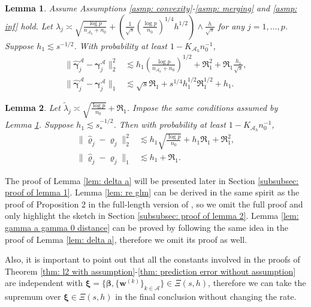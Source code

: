 \documentclass[12pt]{article}
\newcommand{\bxi}{\bm{\xi}}
\newcommand{\twonorm}[1]{\|#1\|_{2}}
\newcommand{\onenorm}[1]{\|#1\|_{1}}
\newcommand{\bbeta}{\bm{\beta}}
\newcommand{\brho}{\bm{\varrho}}
\newcommand{\hrho}{\hat{\bm{\varrho}}}
\newcommand{\tlambda}{\tilde{\lambda}}
\newcommand{\bgammaa}{\bm{\gamma}^{\ma}}
\newcommand{\hgammaa}{\hat{\bm{\gamma}}^{\ma}}
\newcommand{\bwk}[1]{\bm{w}^{(#1)}}
\newcommand{\ma}{\mathcal{A}}
\newcommand{\mah}{\mathcal{A}_h}
\newcommand{\nah}{n_{\mathcal{A}_h}}
\newcommand{\Kah}{K_{\mah}}
\newcommand{\<}{\langle}
\renewcommand{\>}{\rangle}
\newtheorem{lemma}{Lemma}
\begin{document}
\begin{lemma}\label{lem: inf lemma gamma a}
	Assume Assumptions \ref{asmp: convexity}-\ref{asmp: merging} and \ref{asmp: inf} hold. Let $\lambda_j \asymp \sqrt{\frac{\log p}{\nah+n
	_0}} + (\frac{1}{\sqrt{s}}(\frac{\log p}{n_0})^{1/4}h^{1/2})\wedge \frac{h}{\sqrt{s}}$ for any $j = 1, \ldots, p$. Suppose $h_1 \lesssim s^{-1/2}$. With probability at least $1-\Kah n_0^{-1}$,
	\begin{align}
		\twonorm{\hgammaa_j - \bgammaa_j}^2 &\lesssim h_1\left(\frac{\log p}{\nah+n_0}\right)^{1/2} + \Re_1^2 + \Re_1\frac{h_1}{\sqrt{s}},\\
		\onenorm{\hgammaa_j - \bgammaa_j} &\lesssim \sqrt{s}\Re_1 + s^{1/4}h_1^{1/2}\Re_1^{1/2} + h_1.
	\end{align}
\end{lemma}

\begin{lemma}\label{lem: inf lemma gamma delta}
	Let $\tlambda_j \asymp \sqrt{\frac{\log p}{n_0}} + \Re_1$. Impose the same conditions assumed by Lemma \ref{lem: inf lemma gamma a}. Suppose $h_1 \lesssim s_*^{-1/2}$. Then with probability at least $1-\Kah n_0^{-1}$,
	\begin{align}
		\twonorm{\hrho_j - \brho_j}^2 &\lesssim h_1\sqrt{\frac{\log p}{n_0}} + h_1\Re_1 + \Re_1^2,\\
		\onenorm{\hrho_j - \brho_j} &\lesssim h_1 + \Re_1.
	\end{align}
\end{lemma}


The proof of Lemma \ref{lem: delta a} will be presented later in Section \ref{subsubsec: proof of lemma 1}. Lemma \ref{lem: re glm} can be derived in the same spirit as the proof of Proposition 2 in the full-length version of \cite{negahban2009unified}, so we omit the full proof and only highlight the sketch in Section \ref{subsubsec: proof of lemma 2}. Lemma \ref{lem: gamma a gamma 0 distance} can be proved by following the same idea in the proof of Lemma \ref{lem: delta a}, therefore we omit its proof as well.

Also, it is important to point out that all the constants involved in the proofs of Theorem \ref{thm: l2 with assumption}-\ref{thm: prediction error without assumption} are independent with $\bxi = \{\bbeta, \{\bwk{k}\}_{k \in \ma}\} \in \Xi(s, h)$, therefore we can take the supremum over $\bxi \in \Xi(s, h)$ in the final conclusion without changing the rate.

\end{document}
